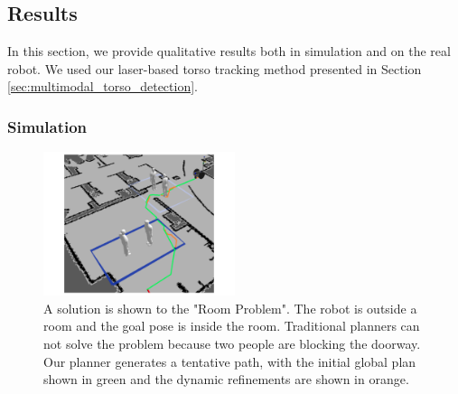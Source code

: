 
\subsection{Results}
\label{sec:navigation_results}

In this section, we provide qualitative results both in simulation and on the real robot. We used our laser-based torso tracking method presented in Section \ref{sec:multimodal_torso_detection}.

\subsubsection{Simulation}
\label{sec:navigation_results_simulation}

\begin{figure}[h!]
\centering
\includegraphics[width=0.5\textwidth]{pics/room_sol_crop}
\caption{A solution is shown to the "Room Problem". The robot is outside a room and the goal pose is inside the room. Traditional planners can not solve the problem because two people are blocking the doorway. Our planner generates a tentative path, with the initial global plan shown in green and the dynamic refinements are shown in orange.}
\label{fig:room_sol}
\end{figure}

